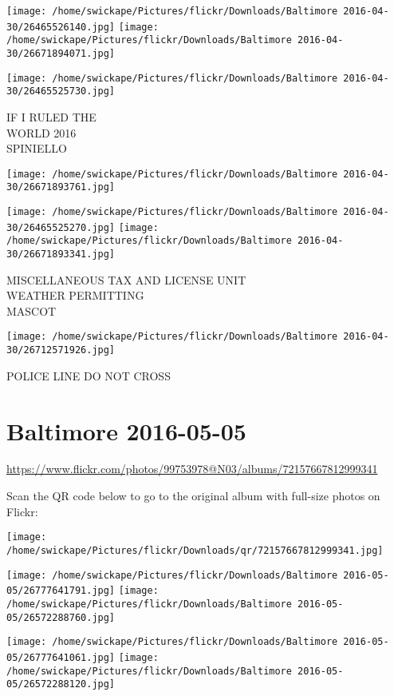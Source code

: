 \documentclass[10pt,letterpaper]{article}
\begin{document}
\texttt{[image: /home/swickape/Pictures/flickr/Downloads/Baltimore 2016-04-30/26465526140.jpg]}
\texttt{[image: /home/swickape/Pictures/flickr/Downloads/Baltimore 2016-04-30/26671894071.jpg]}

\texttt{[image: /home/swickape/Pictures/flickr/Downloads/Baltimore 2016-04-30/26465525730.jpg]}

IF I RULED THE\\
WORLD 2016\\
SPINIELLO
\pagebreak

\texttt{[image: /home/swickape/Pictures/flickr/Downloads/Baltimore 2016-04-30/26671893761.jpg]}

\vspace{0.25in}
\texttt{[image: /home/swickape/Pictures/flickr/Downloads/Baltimore 2016-04-30/26465525270.jpg]}
\texttt{[image: /home/swickape/Pictures/flickr/Downloads/Baltimore 2016-04-30/26671893341.jpg]}

MISCELLANEOUS TAX AND LICENSE UNIT\\
WEATHER PERMITTING\\
MASCOT
\pagebreak

\texttt{[image: /home/swickape/Pictures/flickr/Downloads/Baltimore 2016-04-30/26712571926.jpg]}

POLICE LINE DO NOT CROSS
\pagebreak

\section*{Baltimore 2016-05-05}

\url{https://www.flickr.com/photos/99753978@N03/albums/72157667812999341}

Scan the QR code below to go to the original album with full-size photos on Flickr:

\texttt{[image: /home/swickape/Pictures/flickr/Downloads/qr/72157667812999341.jpg]}
\pagebreak

\texttt{[image: /home/swickape/Pictures/flickr/Downloads/Baltimore 2016-05-05/26777641791.jpg]}
\texttt{[image: /home/swickape/Pictures/flickr/Downloads/Baltimore 2016-05-05/26572288760.jpg]}

\texttt{[image: /home/swickape/Pictures/flickr/Downloads/Baltimore 2016-05-05/26777641061.jpg]}
\texttt{[image: /home/swickape/Pictures/flickr/Downloads/Baltimore 2016-05-05/26572288120.jpg]}
\end{document}

